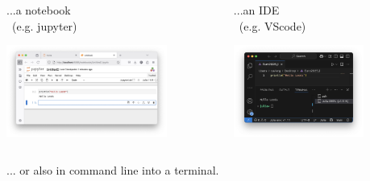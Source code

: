 \documentclass[]{beamer}
\begin{document}
\begin{frame}
\begin{columns}
\begin{column}{0.33\textwidth}
      ...a notebook \\ (e.g. jupyter)
      
      \centerline{{\includegraphics[angle=0,origin=c,height=30mm]{jupyterLeeds.png}}}      
      
      \vspace{10mm}
      \end{column}
      
      \begin{column}{0.3\textwidth}
      \vspace{10mm}
      
      ...an IDE \\ (e.g. VScode)
      
      \centerline{\includegraphics[angle=0,origin=c,height=30mm]{vscodeLeeds.png}}      
      \vspace{5mm}            
      \end{column}  
          
      \end{columns}
      \vspace{5mm}
\hfill  ... or also in command line into a terminal.

\end{frame}



% 
%
\end{document}
